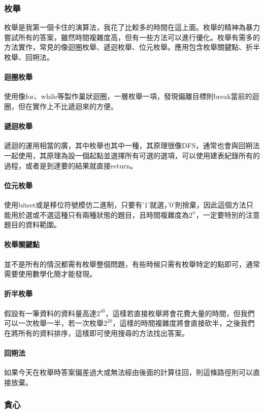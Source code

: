 \documentclass[a4paper, 18pt]{article}
\begin{document}
\subsubsection{枚舉}
枚舉是我第一個卡住的演算法，我花了比較多的時間在這上面。枚舉的精神為暴力嘗試所有的答案，雖然時間複雜度高，但有一些方法可以進行優化。枚舉有需多的方法實作，常見的像迴圈枚舉、遞迴枚舉、位元枚舉。應用包含枚舉關鍵點、折半枚舉、回朔法。

\paragraph{迴圈枚舉}
使用像for、while等製作巢狀迴圈，一層枚舉一項，發現偏離目標則break當前的迴圈，但在實作上不比遞迴來的方便。

\paragraph{遞迴枚舉}
遞迴的運用相當的廣，其中枚舉也其中一種，其原理很像DFS，通常也會與回朔法一起使用，其原理為設一個起點並選擇所有可選的選項，可以使用建表紀錄所有的過程，或者是到達要的結果就直接return。

\paragraph{位元枚舉}
使用bitset或是移位符號模仿二進制，只要有'1'就選，'0'則捨棄，因此這個方法只能用於選或不選這種只有兩種狀態的題目，且時間複雜度為\(2^n\)，一定要特別的注意題目的資料範圍。

\paragraph{枚舉關鍵點}
並不是所有的情況都需有枚舉整個問題，有些時候只需有枚舉特定的點即可，通常需要使用數學化簡才能發現。

\paragraph{折半枚舉}
假設有一筆資料的資料量高達\(2^{40}\)，這樣若直接枚舉將會花費大量的時間，但我們可以一次枚舉一半，若一次枚舉\(2^{20}\)，這樣的時間複雜度將會直接砍半，之後我們在將所有的資料排序，這樣即可使用搜尋的方法找出答案。

\paragraph{回朔法}
如果今天在枚舉時答案偏差過大或無法經由後面的計算往回，則這條路徑則可以直接放棄。

\subsubsection{貪心}
\end{document}
